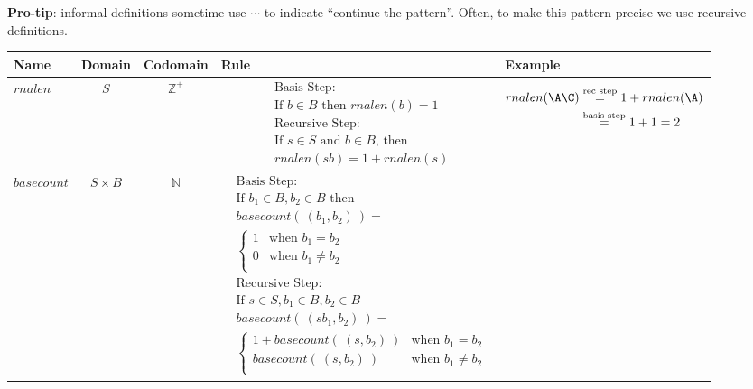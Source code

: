 {\bf Pro-tip}: informal definitions sometime use $\cdots$ to indicate ``continue the pattern''. Often, 
to make this pattern precise we use recursive definitions.
\newpage
\begin{center}
\begin{tabular}{p{0.65in}ccp{2.4in}p{2.4in}}
{\scriptsize {\bf Name}} & {\scriptsize {\bf  Domain}} & {\scriptsize {\bf Codomain}} & {\scriptsize {\bf Rule}} &{\scriptsize {\bf Example}}\\
\hline 
$rnalen$ & $S$ & $\mathbb{Z}^+$ & 
    {\begin{align*}    
    &\textrm{Basis Step:} \\
    &\textrm{If } b \in B\textrm{ then } \textit{rnalen}(b) = 1 \\
    &\textrm{Recursive Step:}\\
    &\textrm{If } s \in S\textrm{ and } b \in B\textrm{, then  }\\
    &\textit{rnalen}(sb) = 1 + \textit{rnalen}(s)
    \end{align*}} & 
    {\begin{align*}
        rnalen(\A\C) &\overset{\text{rec step}}{=} 1 +rnalen(\A) \\ 
        &\overset{\text{basis step}}{=} 1 + 1 = 2
    \end{align*}}\\
\hline
$basecount$ & $S \times B$ & $\mathbb{N}$ & 
{\begin{align*}    
    &\textrm{Basis Step:} \\
    &\textrm{If } b_1 \in B, b_2 \in B \textrm{ then} \\
    &basecount(~(b_1, b_2)~) = \\
    &\begin{cases}
        1 & \textrm{when } b_1 = b_2 \\
        0 & \textrm{when } b_1 \neq b_2 \\
    \end{cases}\\
    &\textrm{Recursive Step:}\\
    &\textrm{If } s \in S, b_1 \in B, b_2 \in B\\
    &basecount(~(sb_1, b_2)~) = \\
    &\begin{cases}
        1 + \textit{basecount}(~(s, b_2)~) & \textrm{when } b_1 = b_2 \\
        \textit{basecount}(~(s, b_2)~) & \textrm{when } b_1 \neq b_2 \\
    \end{cases}

\end{align*}}
\end{tabular}
\end{center}
